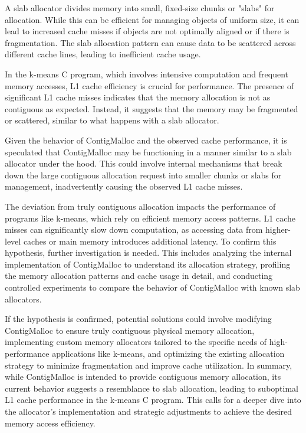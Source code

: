 A slab allocator divides memory into small, fixed-size chunks or "slabs" for allocation. While this can be efficient for managing 
objects of uniform size, it can lead to increased cache misses if objects are not optimally aligned or if there is fragmentation. 
The slab allocation pattern can cause data to be scattered across different cache lines, leading to inefficient cache usage.
\newline

In the k-means C program, which involves intensive computation and frequent memory accesses, L1 cache efficiency is 
crucial for performance. The presence of significant L1 cache misses indicates that the memory allocation is not as 
contiguous as expected. Instead, it suggests that the memory may be fragmented or scattered, similar to what happens with a slab allocator.
\newline

Given the behavior of ContigMalloc and the observed cache performance, it is speculated that ContigMalloc may be 
functioning in a manner similar to a slab allocator under the hood. This could involve internal mechanisms that 
break down the large contiguous allocation request into smaller chunks or slabs for management, inadvertently 
causing the observed L1 cache misses.
\newline

The deviation from truly contiguous allocation impacts the performance of programs like k-means, which rely on efficient 
memory access patterns. L1 cache misses can significantly slow down computation, as accessing data from higher-level 
caches or main memory introduces additional latency. To confirm this hypothesis, further investigation is needed. 
This includes analyzing the internal implementation of ContigMalloc to understand its allocation strategy, 
profiling the memory allocation patterns and cache usage in detail, and conducting controlled experiments 
to compare the behavior of ContigMalloc with known slab allocators.
\newline

If the hypothesis is confirmed, potential solutions could involve modifying ContigMalloc to ensure truly contiguous 
physical memory allocation, implementing custom memory allocators tailored to the specific needs of high-performance 
applications like k-means, and optimizing the existing allocation strategy to minimize fragmentation and improve cache 
utilization. In summary, while ContigMalloc is intended to provide contiguous memory allocation, its current behavior 
suggests a resemblance to slab allocation, leading to suboptimal L1 cache performance in the k-means C program. 
This calls for a deeper dive into the allocator's implementation and strategic adjustments to achieve the 
desired memory access efficiency.
